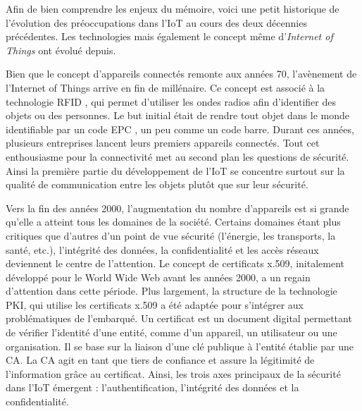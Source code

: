 \newpage

Afin de bien comprendre les enjeux du mémoire, voici une petit historique de l'évolution des préoccupations dans l'\ac{IoT} au cours des deux décennies précédentes. Les technologies mais également le concept même d'\textit{Internet of Things} ont évolué depuis.

\vspace{0.1cm}

Bien que le concept d'appareils connectés remonte aux années 70, l'avène\-ment de l'Internet of Things arrive en fin de millénaire. Ce concept est associé à la technologie \ac{RFID} \cite{RFID}, qui permet d'utiliser les ondes radios afin d'identifier des objets ou des personnes. Le but initial était de rendre tout objet dans le monde identifiable par un code \ac{EPC} \cite{EPC}, un peu comme un code barre. Durant ces années, plusieurs entreprises lancent leurs premiers appareils connectés. Tout cet enthousiasme pour la connectivité met au second plan les questions de sécurité. Ainsi la première partie du développement de l'\ac{IoT} se concentre surtout sur la qualité de communication entre les objets plutôt que sur leur sécurité.

\vspace{0.1cm}

Vers la fin des années 2000, l'augmentation du nombre d'appareils est si grande qu'elle a atteint tous les domaines de la société. Certains domaines étant plus critiques que d'autres d'un point de vue sécurité (l'énergie, les transports, la santé, etc.), l'intégrité des données, la confidentialité et les accès réseaux deviennent le centre de l'attention. 
Le concept de certificats x.509, initalement dévelop\-pé pour le World Wide Web avant les années 2000, a un regain d'attention dans cette période. Plus largement, la structure de la technologie \ac{PKI}, qui utilise les certificats x.509 \cite{PKI} a été adaptée pour s'intégrer aux problématiques de l'embarqué. Un certificat est un document digital permettant de vérifier l'identité d'une entité, comme d'un appareil, un utilisateur ou une organisation. Il se base sur la liaison d'une clé publique à l'entité établie par une \ac{CA}. La CA agit en tant que tiers de confiance et assure la légitimité de l'information grâce au certificat. Ainsi, les trois axes principaux de la sécurité dans l'\ac{IoT} émergent : l'authentification, l'intégrité des données et la confidentialité.

\vspace{0.1cm}


